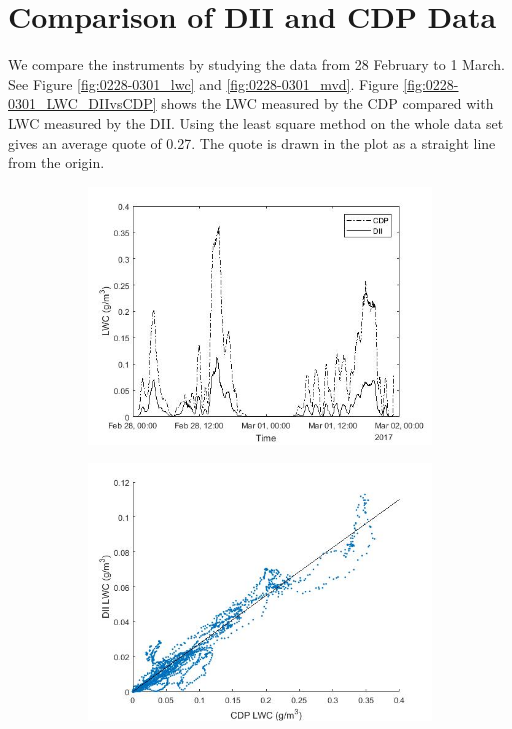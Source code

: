 \section{Comparison of DII and CDP Data}


We compare the instruments by studying the data from 28 February to 1 March. See Figure \ref{fig:0228-0301_lwc} and \ref{fig:0228-0301_mvd}. Figure \ref{fig:0228-0301_LWC_DIIvsCDP} shows the LWC measured by the CDP compared with LWC measured by the DII. Using the least square method on the whole data set gives an average quote of 0.27. The quote is drawn in the plot as a straight line from the origin.

\begin{figure}[hb]
\centering
\begin{subfigure}{.5\textwidth}
  \centering
  \includegraphics[width=1\linewidth]{figures/0228-0301/30min_lwc_CDP_DII_170228-170301_19212_0LpartDII_214646_0LpartCDP}
  \label{fig:0228-0301_LWCvstime}
\end{subfigure}%
\begin{subfigure}{.5\textwidth}
  \centering
  \includegraphics[width=1\linewidth]{figures/0228-0301/Lwcquote_DII-CDP_17022801-17030123_2760min_leastsquare0_2742}

\end{subfigure}
\end{figure}
